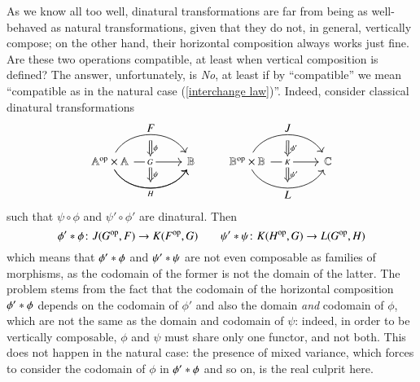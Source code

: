 As we know all too well, dinatural transformations are far from being as well-behaved as natural transformations, given that they do not, in general, vertically compose; on the other hand, their horizontal composition always works just fine. Are these two operations compatible, at least when vertical composition is defined?
The answer, unfortunately, is \emph{No}, at least if by ``compatible'' we mean ``compatible as in the natural case (\ref{interchange law})''. Indeed, consider classical dinatural transformations
\begin{equation}\label{compatibility situation}
\begin{tikzcd}[column sep=0.75cm]
\Op\A \times \A \arrow[rr, bend left=60, ""{name=U,below}]
\arrow[rr, phantom, bend left=60, "F"{above}]
\arrow[rr, "G"{name=D,anchor=center,fill=white,pos=0.34}]
\arrow[rr, bend right=60,""{name=V,above}]
\arrow[rr, bend right=60,"H"{below}]
&  & \B
& \Op\B \times \B \arrow[rr, bend left=60, ""{name=H, below,}]
\arrow[rr,phantom, bend left=60, "J"{above}]
\arrow[rr,"K"{name=E,anchor=center,fill=white},pos=0.35]
\arrow[rr, bend right=60,""{name=K,above}]
\arrow[rr,phantom, bend right=60,"L"{below}]
&  & \C
\arrow[Rightarrow, from=U, to=D,"\phi"]
\arrow[Rightarrow, from=D, to=V,"\psi"]
\arrow[Rightarrow, from=H, to=E, "\phi'"]
\arrow[Rightarrow, from=E,to=K, "\psi'"]
\end{tikzcd}
\end{equation}
such that $\psi\circ\phi$ and $\psi'\circ\phi'$ are dinatural. Then 
\[
\hc \phi {\phi'} \colon J(\Op G,F) \to K(\Op F,G) \qquad
\hc \psi {\psi'} \colon K(\Op H,G) \to L(\Op G,H)
\]
which means that $\hc \phi {\phi'}$ and ${\psi'}\mathbin{\ast}{\psi}$ are not even composable
as families of morphisms, as the codomain of the former is not the domain of the
latter. The problem stems from the fact that the codomain of the horizontal composition $\hc \phi {\phi'}$ depends on the codomain of $\phi'$ and also the domain \emph{and} codomain of $\phi$, which are not the same as the domain and codomain of $\psi$: indeed, in order to be vertically composable, $\phi$ and $\psi$ must share only one functor, and not both. This does not happen in the natural case: the presence of mixed variance, which forces to consider the codomain of $\phi$ in $\hc \phi {\phi'}$ and so on, is the real culprit here. 

